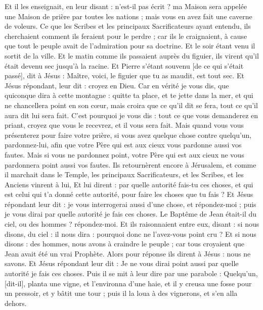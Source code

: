 \begin{multicols}{2}
Et il les enseignait, en leur disant : n'est-il pas écrit ? ma Maison sera appelée une Maison de prière par toutes les nations ; mais vous en avez fait une caverne de voleurs.
Ce que les Scribes et les principaux Sacrificateurs ayant entendu, ils cherchaient comment ils feraient pour le perdre ; car ils le craignaient, à cause que tout le peuple avait de l'admiration pour sa doctrine.
Et le soir étant venu il sortit de la ville.
Et le matin comme ils passaient auprès du figuier, ils virent qu'il était devenu sec jusqu'à la racine.
Et Pierre s'étant souvenu [de ce qui s'était passé], dit à Jésus : Maître, voici, le figuier que tu as maudit, est tout sec.
Et Jésus répondant, leur dit : croyez en Dieu.
Car en vérité je vous dis, que quiconque dira à cette montagne : quitte ta place, et te jette dans la mer, et qui ne chancellera point en son cœur, mais croira que ce qu'il dit se fera, tout ce qu'il aura dit lui sera fait.
C'est pourquoi je vous dis : tout ce que vous demanderez en priant, croyez que vous le recevrez, et il vous sera fait.
Mais quand vous vous présenterez pour faire votre prière, si vous avez quelque chose contre quelqu'un, pardonnez-lui, afin que votre Père qui est aux cieux vous pardonne aussi vos fautes.
Mais si vous ne pardonnez point, votre Père qui est aux cieux ne vous pardonnera point aussi vos fautes.
Ils retournèrent encore à Jérusalem, et comme il marchait dans le Temple, les principaux Sacrificateurs, et les Scribes, et les Anciens vinrent à lui,
Et lui dirent : par quelle autorité fais-tu ces choses, et qui est celui qui t'a donné cette autorité, pour faire les choses que tu fais ?
Et Jésus répondant leur dit : je vous interrogerai aussi d'une chose, et répondez-moi ; puis je vous dirai par quelle autorité je fais ces choses.
Le Baptême de Jean était-il du ciel, ou des hommes ? répondez-moi.
Et ils raisonnaient entre eux, disant : si nous disons, du ciel : il nous dira : pourquoi donc ne l'avez-vous point cru ?
Et si nous disons : des hommes, nous avons à craindre le peuple ; car tous croyaient que Jean avait été un vrai Prophète.
Alors pour réponse ils dirent à Jésus : nous ne savons. Et Jésus répondant leur dit : Je ne vous dirai point aussi par quelle autorité je fais ces choses.
\VerseOne{}Puis il se mit à leur dire par une parabole : Quelqu'un, [dit-il], planta une vigne, et l'environna d'une haie, et il y creusa une fosse pour un pressoir, et y bâtit une tour ; puis il la loua à des vignerons, et s'en alla dehors.

\end{multicols}
